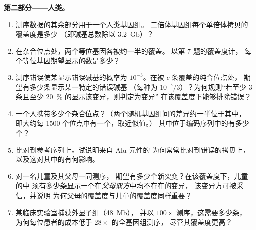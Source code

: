 \begin{problem}
\medskip
\noindent\textbf{第二部分——人类。}
\begin{enumerate}[resume]
  \item 测序数据的其余部分用于一个人类基因组。
        二倍体基因组每个单倍体拷贝的覆盖度是多少
        （即碱基总数除以 \qty{3.2}{Gb}）？
  \item 在杂合位点处，两个等位基因各被约一半的覆盖。
        以第 7 题的覆盖度计，
        每个等位基因期望显示的数是多少？
  \item 测序错误使某显示错误碱基的概率为
        $10^{-3}$。在被 $c$ 条覆盖的纯合位点处，
        期望有多少条显示某一特定的错误碱基
        （每种为 $10^{-3}/3$）？为何规则“若至少
        $3$ 条且至少 \qty{20}{\%} 的显示该变异，则判定为变异”
        在该覆盖度下能够排除错误？
  \item 一个人携带多少个杂合位点？（两个随机基因组间的差异约一半位于其中，
        即大约每 \num{1500} 个位点中有一个，取近似值。）
        其中位于编码序列中的有多少个？
  \item {}比对到参考序列上。试说明来自 Alu 元件的
        为何常常比对到错误的拷贝上，
        以及这对其中的有何影响。
  \item 对一名儿童及其父母一同测序，
        期望有多少个新突变？在该覆盖度下，儿童的中
        须有多少条显示一个在\emph{父母双方}中均不存在的变异，
        该变异方可被采信，并说明
        为何父母的覆盖度与儿童的覆盖度同样重要？
  \item 某临床实验室捕获外显子组（\qty{48}{Mb}），
        并以 $100\times$ 测序，这需要多少条，
        为何每位患者的成本低于 $28\times$ 的全基因组测序，
        尽管其覆盖度更高？
\end{enumerate}


\end{problem}
